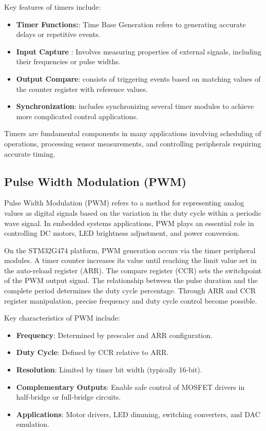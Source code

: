 Key features of timers include:
\begin{itemize}
    \item \textbf{Timer Functions:}: Time Base Generation refers to generating accurate delays or repetitive events.
    \item \textbf{Input Capture }: Involves measuring properties of external signals, including their frequencies or pulse widths.
    \item \textbf{Output Compare}: consists of triggering events based on matching values of the counter register with reference values.
    \item \textbf{Synchronization}: includes synchronizing several timer modules to achieve more complicated control applications.

\end{itemize}

Timers are fundamental components in many applications involving scheduling
of operations, processing sensor measurements, and controlling peripherals requiring
accurate timing.


\subsection{Pulse Width Modulation (PWM)}

Pulse Width Modulation (PWM) refers to a method for representing analog values as digital signals based on the variation in the duty cycle within a periodic wave signal. In embedded systems applications, PWM plays an essential role in controlling DC motors, LED brightness adjustment, and power conversion.

On the STM32G474 platform, PWM generation occurs via the timer peripheral modules. A timer counter increases its value until reaching the limit value set in the auto-reload register (ARR). The compare register (CCR) sets the switchpoint of the PWM output signal. The relationship between the pulse duration and the complete period determines the duty cycle percentage. Through ARR and CCR register manipulation, precise frequency and duty cycle control become possible.

Key characteristics of PWM include:
\begin{itemize}
    \item \textbf{Frequency}: Determined by prescaler and ARR configuration.
    \item \textbf{Duty Cycle}: Defined by CCR relative to ARR.
    \item \textbf{Resolution}: Limited by timer bit width (typically 16‑bit).
    \item \textbf{Complementary Outputs}: Enable safe control of MOSFET drivers in half‑bridge or full‑bridge circuits.
    \item \textbf{Applications}: Motor drivers, LED dimming, switching converters, and DAC emulation.
\end{itemize}


